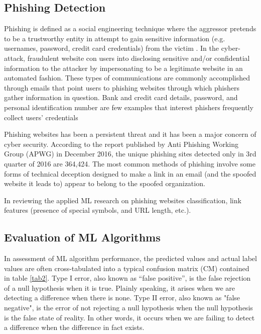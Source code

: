 \documentclass[deca,nonblindrev]{informs3} %
\begin{document}
\subsection{Phishing Detection}
Phishing is defined as a social engineering technique where the aggressor pretends to be a trustworthy entity in attempt to gain sensitive information (e.g. usernames, password, credit card credentials) from the victim \citep{Jagatic2007}. In the cyber-attack, fraudulent website con users into disclosing sensitive and/or confidential information to the attacker by impersonating to be a legitimate website in an automated fashion.  These types of communications are commonly accomplished through emails that point users to phishing websites through which phishers gather information in question.  Bank and credit card details, password, and personal identification number are few examples that interest phishers frequently collect users’ credentials \citep{jakobsson2006phishing}

Phishing websites has been a persistent threat and it has been a major concern of cyber security.  According to the report published by Anti Phishing Working Group (APWG) in December 2016, the unique phishing sites detected only in 3rd quarter of 2016 are 364,424. The most common methods of phishing involve some forms of technical deception designed to make a link in an email (and the spoofed website it leads to) appear to belong to the spoofed organization. 

In reviewing the applied ML research on phishing websites classification,    link features (presence of special symbols, and URL length, etc.).

 



\subsection{Evaluation of ML Algorithms}

In assessment of ML algorithm performance, the predicted  values and actual label values  are often cross-tabulated into  a typical confusion matrix (CM) contained in  table \ref{tab2}. Type I error, also known as “false positive”, is the false rejection of a null hypothesis when it is true. Plainly speaking, it arises when we are detecting a difference when there is none. Type II error, also known as "false negative", is the error of not rejecting a null hypothesis when the null hypothesis is the false state of reality. In other words, it occurs when we are failing to detect a difference when the difference in fact exists.
\end{document}

